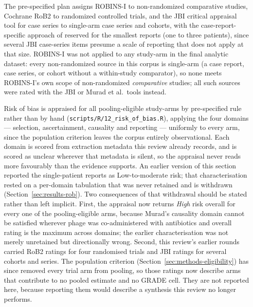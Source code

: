 The pre-specified plan assigns ROBINS-I \parencite{Sterne2016_robinsi} to non-randomized comparative studies, Cochrane RoB2 \parencite{Sterne2019_rob2} to randomized controlled trials, and the JBI critical appraisal tool for case series \parencite{Munn2020_jbicaseseries} to single-arm case series and cohorts, with the case-report-specific approach of \textcite{Murad2018_casereports} reserved for the smallest reports (one to three patients), since several JBI case-series items presume a scale of reporting that does not apply at that size. ROBINS-I was not applied to any study-arm in the final analytic dataset: every non-randomized source in this corpus is single-arm (a case report, case series, or cohort without a within-study comparator), so none meets ROBINS-I's own scope of non-randomized \emph{comparative} studies; all such sources were rated with the JBI or Murad et al.\ tools instead.

Risk of bias is appraised for all \ArmsAnalysed pooling-eligible study-arms by pre-specified rule rather than by hand (\texttt{scripts/R/12\_risk\_of\_bias.R}), applying the four \textcite{Murad2018_casereports} domains --- selection, ascertainment, causality and reporting --- uniformly to every arm, since the population criterion leaves the corpus entirely observational. Each domain is scored from extraction metadata this review already records, and is scored as unclear wherever that metadata is silent, so the appraisal never reads more favourably than the evidence supports. An earlier version of this section reported the single-patient reports as Low-to-moderate risk; that characterisation rested on a per-domain tabulation that was never retained and is withdrawn (Section~\ref{sec:results-rob}). Two consequences of that withdrawal should be stated rather than left implicit. First, the appraisal now returns \emph{High} risk overall for every one of the \ArmsAnalysed pooling-eligible arms, because Murad's causality domain cannot be satisfied wherever phage was co-administered with antibiotics and overall rating is the maximum across domains; the earlier characterisation was not merely unretained but directionally wrong. Second, this review's earlier rounds carried RoB2 ratings for four randomised trials and JBI ratings for several cohorts and series. The population criterion (Section~\ref{sec:methods-eligibility}) has since removed every trial arm from pooling, so those ratings now describe arms that contribute to no pooled estimate and no GRADE cell. They are not reported here, because reporting them would describe a synthesis this review no longer performs.

